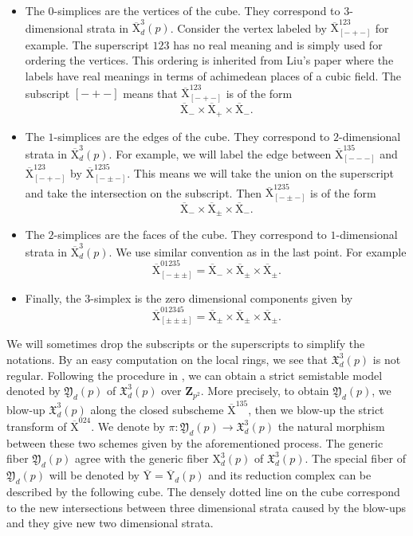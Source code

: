 \documentclass[10pt]{amsart}
\newcommand*\Z{\mathds{Z}}
\newcommand*\ZZ{|[draw,circle]| \Z_2}
\numberwithin{equation}{section}
\theoremstyle{plain}
\numberwithin{equation}{section}
\theoremstyle{definition}
\theoremstyle{remark}
\def\ZZ{\mathbf{Z}}
\def\rmX{\mathrm{X}}
\def\rmXbar{\overline{\rmX}}
\def\rmY{\mathrm{Y}}
\def\rmYbar{\overline{\rmY}}
\begin{document}
\begin{itemize}
\item The $0$-simplices are the vertices of the cube. They correspond to $3$-dimensional strata in $\rmXbar^{3}_{d}(p)$. Consider the vertex labeled by $\rmXbar^{123}_{[-+-]}$ for example. The superscript $123$ has no real meaning and is simply used for ordering the vertices. This ordering is inherited from Liu's paper \cite{Liu-cubic} where the labels have real meanings in terms of achimedean places of a cubic field. The subscript $[-+-]$ means that $\rmXbar^{123}_{[-+-]}$ is of the form
\begin{equation*}
\rmXbar_{-}\times \rmXbar_{+}\times \rmXbar_{-}. 
\end{equation*}
\item The $1$-simplices are the edges of the cube. They correspond to $2$-dimensional strata in $\rmXbar^{3}_{d}(p)$. For example, we will label the edge between  ${\rmXbar}^{135}_{[---]}$ and ${\rmXbar}^{123}_{[-+-]}$ by $\rmXbar^{1235}_{[-\pm-]}$. This means we will take the union on the superscript and take the intersection on the subscript. Then $\rmXbar^{1235}_{[-\pm-]}$ is of the form
\begin{equation*}
\rmXbar_{-}\times \rmXbar_{\pm} \times \rmXbar_{-}.
\end{equation*}
\item The $2$-simplices are the faces of the cube. They correspond to $1$-dimensional strata in $\rmXbar^{3}_{d}(p)$. We use similar convention as in the last point. For example
\begin{equation*}
\rmXbar^{01235}_{[-\pm\pm]}=\rmXbar_{-}\times \rmXbar_{\pm} \times  \rmXbar_{\pm}.
\end{equation*}
\item Finally, the $3$-simplex is the zero dimensional components given by 
\begin{equation*}
\rmXbar^{012345}_{[\pm\pm\pm]}=\rmXbar_{\pm}\times \rmXbar_{\pm} \times \rmXbar_{\pm}.
\end{equation*}
\end{itemize}
We will sometimes drop the subscripts or the superscripts to simplify the notations. By an easy computation on the local rings, we see that $\mathfrak{X}^{3}_{d}(p)$ is not regular. Following the procedure in \cite[Example 6.15]{GS}, we can obtain a strict semistable model denoted by $\mathfrak{Y}_{d}(p)$  of $\mathfrak{X}^{3}_{d}(p)$ over $\ZZ_{p^{2}}$. More precisely, to obtain $\mathfrak{Y}_{d}(p)$, we blow-up $\mathfrak{X}^{3}_{d}(p)$ along the closed subscheme $\rmXbar^{135}$, then we blow-up the strict transform of $\rmXbar^{024}$. We denote by $\pi: \mathfrak{Y}_{d}(p)\rightarrow \mathfrak{X}^{3}_{d}(p)$ the natural morphism between these two schemes given by the aforementioned process. The generic fiber $\mathfrak{Y}_{d}(p)$ agree with the generic fiber $\rmX^{3}_{d}(p)$ of $\mathfrak{X}^{3}_{d}(p)$. The special fiber of $\mathfrak{Y}_{d}(p)$ will be denoted by $\rmYbar=\rmYbar_{d}(p)$ and its reduction complex can be described by the following cube. The densely dotted line on the cube correspond to the new intersections between three dimensional strata caused by the blow-ups and they give new two dimensional strata. 
\end{document}
